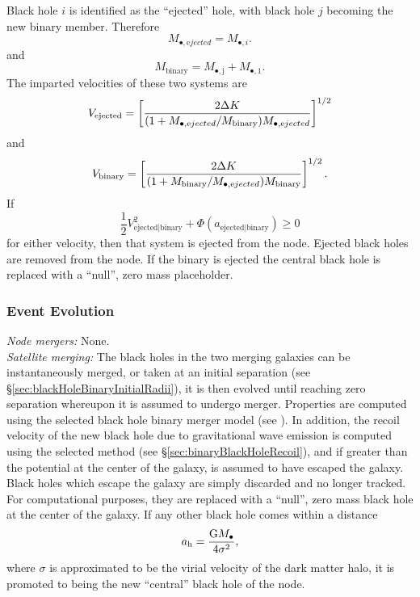 Black hole $i$ is identified as the ``ejected'' hole, with black hole $j$ becoming the new binary member. Therefore
\begin{equation}
 M_{\bullet, \mathrm ejected} = M_{\bullet, i}.
\end{equation}
and
\begin{equation}
 M_\mathrm{binary} = M_\mathrm{\bullet, j} + M_\mathrm{\bullet, 1}.
\end{equation}
The imparted velocities of these two systems are
\begin{equation}
 V_\mathrm{ejected} = \left[ {2 \Delta K \over (1+M_{\bullet, \mathrm ejected}/M_\mathrm{binary} ) M_{\bullet, \mathrm ejected} }\right]^{1/2}
\end{equation}
and
\begin{equation}
 V_\mathrm{binary} = \left[ {2 \Delta K \over (1+M_\mathrm{binary} /M_{\bullet, \mathrm ejected}) M_\mathrm{binary}}\right]^{1/2}.
\end{equation}
If
\begin{equation}
 \frac{1}{2} V_\mathrm{ejected|binary}^2 + \Phi(a_\mathrm{ejected|binary}) \ge 0
\end{equation}
for either velocity, then that system is ejected from the node. Ejected black holes are removed from the node. If the binary is ejected the central black hole is replaced with a ``null'', zero mass placeholder.

\subsubsection{Event Evolution}

\noindent\emph{Node mergers:} None.\\

\noindent\emph{Satellite merging:} The black holes in the two merging galaxies can be instantaneously merged, or taken at an initial separation (see \S\ref{sec:blackHoleBinaryInitialRadii}), it is then evolved until reaching zero separation whereupon it is assumed to undergo merger. Properties are computed using the selected black hole binary merger model (see ). In addition, the recoil velocity of the new black hole due to gravitational wave emission is computed using the selected method (see \S\ref{sec:binaryBlackHoleRecoil}), and if greater than the potential at the center of the galaxy, is assumed to have escaped the galaxy. Black holes which escape the galaxy are simply discarded and no longer tracked. For computational purposes, they are replaced with a ``null'', zero mass black hole at the center of the galaxy. If any other black hole comes within a distance 
\begin{equation}
a_\mathrm{h} = {\mathrm{G} M_\bullet \over 4 \sigma^2},
\end{equation}
where $\sigma$ is approximated to be the virial velocity of the dark matter halo, it is promoted to being the new ``central'' black hole of the node.\\

